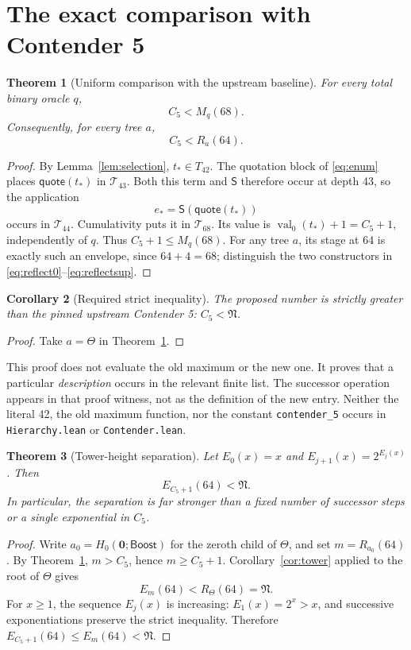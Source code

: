 \documentclass[11pt]{article}
\newtheorem{theorem}{Theorem}[section]
\newtheorem{corollary}[theorem]{Corollary}
\theoremstyle{definition}
\newcommand{\leaf}{\mathbf 0}
\newcommand{\val}{\operatorname{val}}
\newcommand{\Qte}{\mathsf{quote}}
\newcommand{\Sc}{\mathsf S}
\newcommand{\Boost}{\mathsf{Boost}}
\newcommand{\Entry}{\mathfrak N}
\newcommand{\Cfive}{C_5}
\newcommand{\code}[1]{\texttt{#1}}
\begin{document}
\section{The exact comparison with Contender 5}
\label{sec:comparison}

\begin{theorem}[Uniform comparison with the upstream baseline]
\label{thm:baseline}
For every total binary oracle $q$,
\[
 \Cfive<M_q(68).
\]
Consequently, for every tree $a$,
\[
 \Cfive<R_a(64).
\]
\end{theorem}
\begin{proof}
By Lemma~\ref{lem:selection}, $t_*\in T_{42}$. The quotation block of
\eqref{eq:enum} places $\Qte(t_*)$ in $\mathcal T_{43}$. Both this term
and $\Sc$ therefore occur at depth 43, so the application
\[
 e_* = \Sc(\Qte(t_*))
\]
occurs in $\mathcal T_{44}$. Cumulativity puts it in $\mathcal T_{68}$.
Its value is $\val_0(t_*)+1=\Cfive+1$, independently of $q$. Thus
$\Cfive+1\le M_q(68)$. For any tree $a$, its stage at 64 is exactly such
an envelope, since $64+4=68$; distinguish the two constructors in
\eqref{eq:reflect0}--\eqref{eq:reflectsup}.
\end{proof}

\begin{corollary}[Required strict inequality]\label{cor:entry}
The proposed number is strictly greater than the pinned upstream Contender 5:
$\Cfive<\Entry$.
\end{corollary}
\begin{proof}
Take $a=\Theta$ in Theorem~\ref{thm:baseline}.
\end{proof}

This proof does not evaluate the old maximum or the new one. It proves that
a particular \emph{description} occurs in the relevant finite list. The
successor operation appears in that proof witness, not as the definition of
the new entry. Neither the literal 42, the old maximum function, nor the
constant \code{contender\_5} occurs in \code{Hierarchy.lean} or
\code{Contender.lean}.

\begin{theorem}[Tower-height separation]\label{thm:towerentry}
Let $E_0(x)=x$ and $E_{j+1}(x)=2^{E_j(x)}$. Then
\begin{equation}\label{eq:towerfinal}
 E_{\Cfive+1}(64)<\Entry.
\end{equation}
In particular, the separation is far stronger than a fixed number of
successor steps or a single exponential in $\Cfive$.
\end{theorem}
\begin{proof}
Write $a_0=H_0(\leaf;\Boost)$ for the zeroth child of $\Theta$, and set
$m=R_{a_0}(64)$. By Theorem~\ref{thm:baseline}, $m>\Cfive$, hence
$m\ge\Cfive+1$. Corollary~\ref{cor:tower} applied to the root of $\Theta$
gives
\[
 E_m(64)<R_\Theta(64)=\Entry.
\]
For $x\ge1$, the sequence $E_j(x)$ is increasing: $E_1(x)=2^x>x$, and
successive exponentiations preserve the strict inequality. Therefore
$E_{\Cfive+1}(64)\le E_m(64)<\Entry$.
\end{proof}
\end{document}
